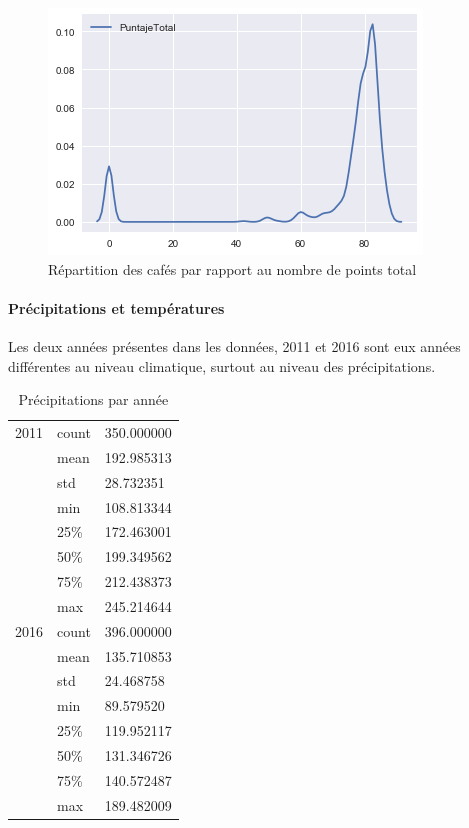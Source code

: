 \begin{figure}[H]
	\centering
	\includegraphics[width=0.7\linewidth]{img/Exploration/kdeplotPuntajeTotal}
	\caption{Répartition des cafés par rapport au nombre de points total}
	\label{fig:kdeplotpuntajetotal}
\end{figure}



\newpage
\paragraph{Précipitations et températures} Les deux années présentes dans les données, 2011 et 2016 sont eux années différentes au niveau climatique, surtout au niveau des précipitations.  

\begin{table}[H]
	\centering
	\caption{Précipitations par année}
	\label{YearlyPrec1}
	\begin{tabular}{lll}
		2011 & count                               & 350.000000 \\
		&mean & 192.985313                                      \\
		&std  & 28.732351                                       \\
		&min  & 108.813344                                     \\
		&25\% & 172.463001                                     \\
		&50\% & 199.349562                                      \\
		&75\% & 212.438373                                      \\
		&max  & 245.214644                                      \\
	2016 & count                               & 396.000000 \\
		&mean & 135.710853                                      \\
		&std  & 24.468758                                      \\
		&min  & 89.579520                                       \\
		&25\% & 119.952117                                      \\
		&50\% & 131.346726                                      \\
		&75\% & 140.572487                                      \\
		&max  & 189.482009                   
	\end{tabular}
\end{table}


